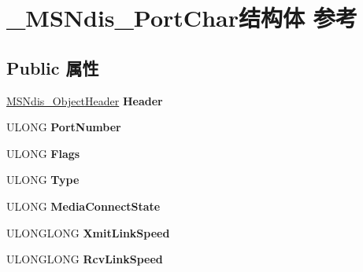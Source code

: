 \hypertarget{struct___m_s_ndis___port_char}{}\section{\+\_\+\+M\+S\+Ndis\+\_\+\+Port\+Char结构体 参考}
\label{struct___m_s_ndis___port_char}
\subsection*{Public 属性}
\begin{DoxyCompactItemize}
\item 
\mbox{\label{struct___m_s_ndis___port_char_aa5b1e86860a442ed2cdaa4233b42aaed}} 
\hyperlink{struct___m_s_ndis___object_header}{M\+S\+Ndis\+\_\+\+Object\+Header} {\bfseries Header}
\item 
\mbox{\label{struct___m_s_ndis___port_char_a708d296cd16f8c83c1d740586e2c9a1e}} 
U\+L\+O\+NG {\bfseries Port\+Number}
\item 
\mbox{\label{struct___m_s_ndis___port_char_a618b8bbd0e7fc8479adc6aef82678575}} 
U\+L\+O\+NG {\bfseries Flags}
\item 
\mbox{\label{struct___m_s_ndis___port_char_a9dca4074e1f43cdf621415ba81986ff0}} 
U\+L\+O\+NG {\bfseries Type}
\item 
\mbox{\label{struct___m_s_ndis___port_char_a544e22b563781d37badb692c82ee70af}} 
U\+L\+O\+NG {\bfseries Media\+Connect\+State}
\item 
\mbox{\label{struct___m_s_ndis___port_char_abb6aa167bd35019b6e655b9e2f408258}} 
U\+L\+O\+N\+G\+L\+O\+NG {\bfseries Xmit\+Link\+Speed}
\item 
\mbox{\label{struct___m_s_ndis___port_char_aa74a08de20ee1659fc0c4687a60965b6}} 
U\+L\+O\+N\+G\+L\+O\+NG {\bfseries Rcv\+Link\+Speed}
\item 
\mbox{\label{struct___m_s_ndis___port_char_af46c00c050ce6312a00fc370e26c3243}} 

\end{DoxyCompactItemize}
